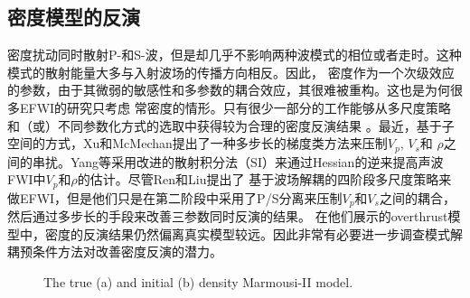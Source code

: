 \subsection{密度模型的反演}
密度扰动同时散射P-和S-波，但是却几乎不影响两种波模式的相位或者走时。这种模式的散射能量大多与入射波场的传播方向相反\cite[]{wu.aki:1985,tarantola:1986}。因此，
密度作为一个次级效应的参数，由于其微弱的敏感性和多参数的耦合效应\cite[]{tarantola:1986,forgues.lambare:1997}，其很难被重构。这也是为何很多EFWI的研究只考虑
常密度的情形\cite[]{shipp:2002,sears:2008,brossier2009}。只有很少一部分的工作能够从多尺度策略和（或）不同参数化方式的选取中获得较为合理的密度反演结果
\cite{jeong2012full}。最近，基于子空间的方式\cite[]{kennett:1988}，Xu和McMechan\cite{xu.mcmechan:2014}提出了一种多步长的梯度类方法来压制$V_p$, $V_s$和
$\rho$之间的串扰。Yang等\cite{yang:2016}采用改进的散射积分法（SI）来通过Hessian的逆来提高声波FWI中$V_p$和$\rho$的估计。尽管Ren和Liu\cite{ren.liu:2016}提出了
基于波场解耦的四阶段多尺度策略来做EFWI，但是他们只是在第二阶段中采用了P/S分离来压制$V_p$和$V_s$之间的耦合，然后通过多步长的手段来改善三参数同时反演的结果。
在他们展示的overthrust模型中，密度的反演结果仍然偏离真实模型较远。因此非常有必要进一步调查模式解耦预条件方法对改善密度反演的潜力。
\begin{figure}
    \begin{center}
    \caption{
                The true (a) and initial (b) density Marmousi-II model.
    }
    \label{fig:Marrho}
    \end{center}
\end{figure}

